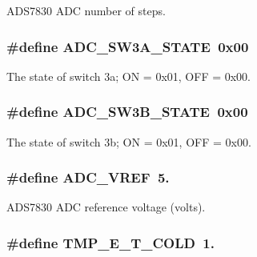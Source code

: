 A\-D\-S7830 A\-D\-C number of steps. \hypertarget{a00058_ac80e67c94bf6570094bba2248b9586f3}{
\subsubsection[{A\-D\-C\-\_\-\-S\-W3\-A\-\_\-\-S\-T\-A\-T\-E}]{\setlength{\rightskip}{0pt plus 5cm}\#define A\-D\-C\-\_\-\-S\-W3\-A\-\_\-\-S\-T\-A\-T\-E~0x00}}\label{a00058_ac80e67c94bf6570094bba2248b9586f3}
The state of switch 3a; O\-N = 0x01, O\-F\-F = 0x00. \hypertarget{a00058_a63e298aff78f6afee6ebffa60c1de62a}{
\subsubsection[{A\-D\-C\-\_\-\-S\-W3\-B\-\_\-\-S\-T\-A\-T\-E}]{\setlength{\rightskip}{0pt plus 5cm}\#define A\-D\-C\-\_\-\-S\-W3\-B\-\_\-\-S\-T\-A\-T\-E~0x00}}\label{a00058_a63e298aff78f6afee6ebffa60c1de62a}
The state of switch 3b; O\-N = 0x01, O\-F\-F = 0x00. \hypertarget{a00058_a5a03d0b939a8dda552c9fe3319a82485}{
\subsubsection[{A\-D\-C\-\_\-\-V\-R\-E\-F}]{\setlength{\rightskip}{0pt plus 5cm}\#define A\-D\-C\-\_\-\-V\-R\-E\-F~5.}}\label{a00058_a5a03d0b939a8dda552c9fe3319a82485}
A\-D\-S7830 A\-D\-C reference voltage (volts). \hypertarget{a00058_acc66f9f90ea4746679f5d26c834ddea5}{
\subsubsection[{T\-M\-P\-\_\-\-E\-\_\-\-T\-\_\-\-C\-O\-L\-D}]{\setlength{\rightskip}{0pt plus 5cm}\#define T\-M\-P\-\_\-\-E\-\_\-\-T\-\_\-\-C\-O\-L\-D~1.}}\label{a00058_acc66f9f90ea4746679f5d26c834ddea5}
